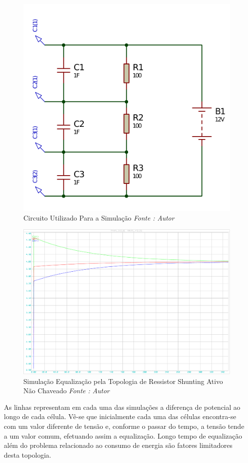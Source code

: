 \documentclass[11pt, a4paper, oneside]{article}
\begin{document}
\begin{figure}[h!]
\centering
\includegraphics[width=.6\linewidth]{1}
\caption{Circuito Utilizado Para a Simulação \textit{Fonte : Autor}}
\label{fig:estrutura_equalizador_passivo_ apacitor}
\end{figure}

\begin{figure}[h!]
\centering
\includegraphics[width=1\linewidth]{Equalizador_de_tensao_ativo_nao_chaveado}
\caption{Simulação Equalização pela Topologia de Ressistor Shunting Ativo Não Chaveado \textit{Fonte : Autor}}
\label{fig:estrutura_equalizador_passivo_ apacitor}
\end{figure}

As linhas representam em cada uma das simulações a diferença de potencial
ao longo de cada célula. Vê-se que inicialmente cada uma das células encontra-se
com um valor diferente de tensão e, conforme o passar do tempo, a tensão tende a
um valor comum, efetuando assim a equalização. Longo tempo de equalização além
do problema relacionado ao consumo de energia são fatores limitadores desta
topologia.
\end{document}
